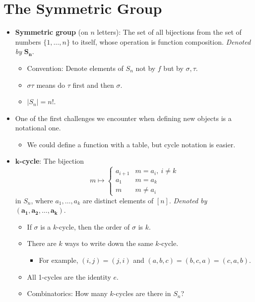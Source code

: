 \documentclass[../notes.tex]{subfiles}
\begin{document}
\section{The Symmetric Group}
\begin{itemize}
    \item {}\textbf{Symmetric group} (on $n$ letters): The set of all bijections from the set of numbers $\{1,\dots,n\}$ to itself, whose operation is function composition. \emph{Denoted by} $\bm{S_n}$.
    \begin{itemize}
        \item Convention: Denote elements of $S_n$ not by $f$ but by $\sigma,\tau$.
        \item $\sigma\tau$ means do $\tau$ first and then $\sigma$.
        \item $|S_n|=n!$.
    \end{itemize}
    \item One of the first challenges we encounter when defining new objects is a notational one.
    \begin{itemize}
        \item We could define a function with a table, but cycle notation is easier.
    \end{itemize}
    \item \textbf{$\bm{k}$-cycle}: The bijection
    \begin{equation*}
        m \mapsto
        \begin{cases}
            a_{i+1} & m=a_i,\ i\neq k\\
            a_1 & m=a_k\\
            m & m\neq a_i
        \end{cases}
    \end{equation*}
    in $S_n$, where $a_1,\dots,a_k$ are distinct elements of $[n]$. \emph{Denoted by} $\bm{(a_1,a_2,\ldots,a_k)}$.
    \begin{itemize}
        \item If $\sigma$ is a $k$-cycle, then the order of $\sigma$ is $k$.
        \item There are $k$ ways to write down the same $k$-cycle.
        \begin{itemize}
            \item For example, $(i,j)=(j,i)$ and $(a,b,c)=(b,c,a)=(c,a,b)$.
        \end{itemize}
        \item All 1-cycles are the identity $e$.
        \item Combinatorics: How many $k$-cycles are there in $S_n$?

\end{itemize}
\end{itemize}
\end{document}
